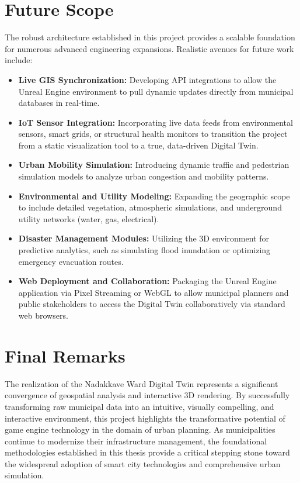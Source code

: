 \section{Future Scope}
The robust architecture established in this project provides a scalable foundation for numerous advanced engineering expansions. Realistic avenues for future work include:
\begin{itemize}
    \item \textbf{Live GIS Synchronization:} Developing API integrations to allow the Unreal Engine environment to pull dynamic updates directly from municipal databases in real-time.
    \item \textbf{IoT Sensor Integration:} Incorporating live data feeds from environmental sensors, smart grids, or structural health monitors to transition the project from a static visualization tool to a true, data-driven Digital Twin.
    \item \textbf{Urban Mobility Simulation:} Introducing dynamic traffic and pedestrian simulation models to analyze urban congestion and mobility patterns.
    \item \textbf{Environmental and Utility Modeling:} Expanding the geographic scope to include detailed vegetation, atmospheric simulations, and underground utility networks (water, gas, electrical).
    \item \textbf{Disaster Management Modules:} Utilizing the 3D environment for predictive analytics, such as simulating flood inundation or optimizing emergency evacuation routes.
    \item \textbf{Web Deployment and Collaboration:} Packaging the Unreal Engine application via Pixel Streaming or WebGL to allow municipal planners and public stakeholders to access the Digital Twin collaboratively via standard web browsers.
\end{itemize}

\section{Final Remarks}
The realization of the Nadakkave Ward Digital Twin represents a significant convergence of geospatial analysis and interactive 3D rendering. By successfully transforming raw municipal data into an intuitive, visually compelling, and interactive environment, this project highlights the transformative potential of game engine technology in the domain of urban planning. As municipalities continue to modernize their infrastructure management, the foundational methodologies established in this thesis provide a critical stepping stone toward the widespread adoption of smart city technologies and comprehensive urban simulation.
